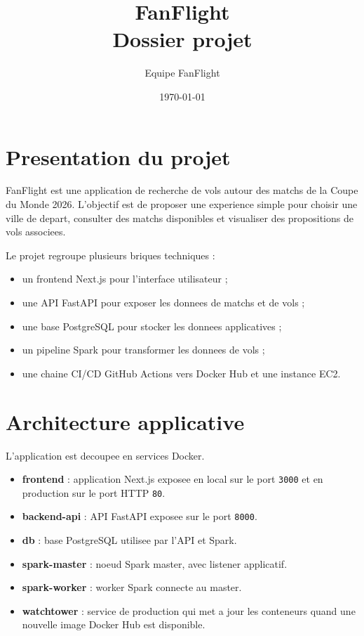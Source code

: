 \documentclass[12pt,a4paper]{article}
\title{FanFlight\\Dossier projet}
\author{Equipe FanFlight}
\date{\today}
\begin{document}
\maketitle
\tableofcontents
\newpage

\section{Presentation du projet}

FanFlight est une application de recherche de vols autour des matchs de la Coupe du Monde 2026.
L'objectif est de proposer une experience simple pour choisir une ville de depart, consulter des matchs disponibles et visualiser des propositions de vols associees.

Le projet regroupe plusieurs briques techniques :

\begin{itemize}
  \item un frontend Next.js pour l'interface utilisateur ;
  \item une API FastAPI pour exposer les donnees de matchs et de vols ;
  \item une base PostgreSQL pour stocker les donnees applicatives ;
  \item un pipeline Spark pour transformer les donnees de vols ;
  \item une chaine CI/CD GitHub Actions vers Docker Hub et une instance EC2.
\end{itemize}

\section{Architecture applicative}

L'application est decoupee en services Docker.

\begin{itemize}
  \item \textbf{frontend} : application Next.js exposee en local sur le port \texttt{3000} et en production sur le port HTTP \texttt{80}.
  \item \textbf{backend-api} : API FastAPI exposee sur le port \texttt{8000}.
  \item \textbf{db} : base PostgreSQL utilisee par l'API et Spark.
  \item \textbf{spark-master} : noeud Spark master, avec listener applicatif.
  \item \textbf{spark-worker} : worker Spark connecte au master.
  \item \textbf{watchtower} : service de production qui met a jour les conteneurs quand une nouvelle image Docker Hub est disponible.
\end{itemize}
\end{document}
